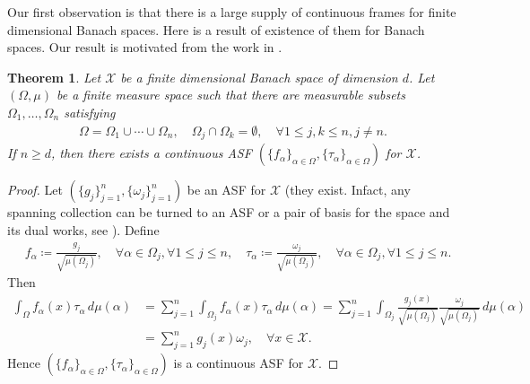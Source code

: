 \documentclass{amsart}
\newtheorem{theorem}{Theorem}[section]
\begin{document}
  
  	
  

  
  
 
  
  
  
  
  
 
  
  
 
  Our first  observation is  that there is a large supply   of continuous frames for finite dimensional Banach spaces.  Here is a  result of  existence of them for  Banach spaces. Our result is motivated from the work in \cite{RAHIMIDARABYDARVISHI}.
  \begin{theorem}\label{FBFRAMEEXIST}
  	Let $\mathcal{X}$ be a finite dimensional Banach space of dimension $d$. 	Let $(\Omega, \mu)$ be a finite measure space such that there are measurable subsets $\Omega_1, \dots, \Omega_n$   satisfying 
  	\begin{align*}
  		\Omega=\Omega_1\cup \cdots \cup \Omega_n, \quad \Omega_j \cap \Omega_k=\emptyset, \quad \forall 1\leq j,k \leq n, j \neq n.
  	\end{align*} 
  If $n\geq d$,	 then there exists a continuous ASF  $(\{f_\alpha\}_{\alpha\in \Omega},\{\tau_\alpha\}_{\alpha\in \Omega})$  for $\mathcal{X}$.
  \end{theorem}
\begin{proof}
Let $ (\{g_j \}_{j=1}^n, \{\omega_j \}_{j=1}^n) $ be an ASF  for $\mathcal{X}$	(they exist. Infact, any spanning collection can be turned to an ASF or a pair of basis for the space and its dual works, see \cite{KRISHNAJOHNSON, MAHESHTHESIS}). Define
\begin{align*}
&f_\alpha \coloneqq \frac{g_j}{\sqrt{\mu(\Omega_j)}}	,\quad  \forall \alpha \in \Omega_j, \forall 1\leq j \leq n, \quad \tau_\alpha \coloneqq \frac{\omega_j}{\sqrt{\mu(\Omega_j)}}	,\quad  \forall \alpha \in \Omega_j,\forall 1\leq j \leq n.
\end{align*} 
Then 
\begin{align*}
	\int_{\Omega} f_\alpha (x)\tau_\alpha\, d \mu (\alpha)&=\sum_{j=1}^n\int_{\Omega_j} f_\alpha (x)\tau_\alpha\, d \mu (\alpha)=\sum_{j=1}^n\int_{\Omega_j}\frac{g_j(x)}{\sqrt{\mu(\Omega_j)}}\frac{\omega_j}{\sqrt{\mu(\Omega_j)}}\, d \mu (\alpha)\\
	&=\sum_{j=1}^ng_j(x)\omega_j, \quad \forall x \in \mathcal{X}.
\end{align*}
Hence $(\{f_\alpha\}_{\alpha\in \Omega},\{\tau_\alpha\}_{\alpha\in \Omega})$ is a continuous ASF  for $\mathcal{X}$.
\end{proof}
\end{document}
